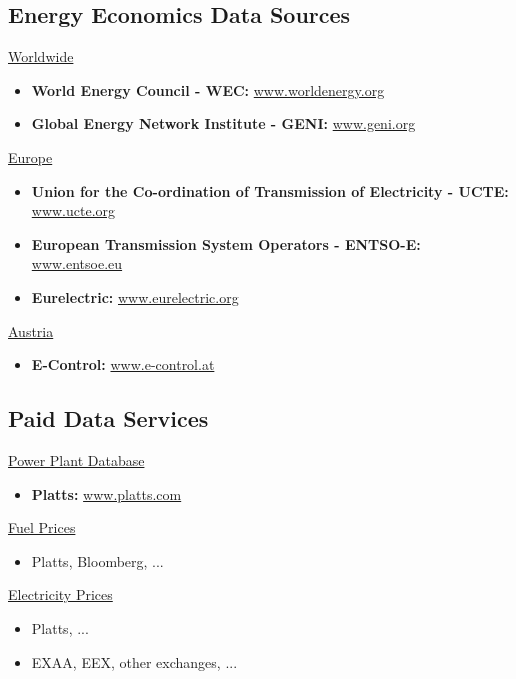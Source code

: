 \subsection{Energy Economics Data Sources}
\label{sec:energyEconomicsDataSources}

\underline{Worldwide}
\begin{itemize}
    \item \textbf{World Energy Council - WEC:} \url{www.worldenergy.org}
    \item \textbf{Global Energy Network Institute - GENI:} \url{www.geni.org}
\end{itemize}

\underline{Europe}
\begin{itemize}
    \item \textbf{Union for the Co-ordination of Transmission of Electricity - UCTE:} \url{www.ucte.org}
    \item \textbf{European Transmission System Operators - ENTSO-E:} \url{www.entsoe.eu}
    \item \textbf{Eurelectric:} \url{www.eurelectric.org}
\end{itemize}

\underline{Austria}
\begin{itemize}
    \item \textbf{E-Control:} \url{www.e-control.at}
\end{itemize}


\subsection{Paid Data Services}
\label{sec:paidDataServices}

\underline{Power Plant Database}
\begin{itemize}
    \item \textbf{Platts:} \url{www.platts.com}
\end{itemize}

\underline{Fuel Prices}
\begin{itemize}
    \item Platts, Bloomberg, ...
\end{itemize}

\underline{Electricity Prices}
\begin{itemize}
    \item Platts, ...
    \item EXAA, EEX, other exchanges, ...
\end{itemize}

